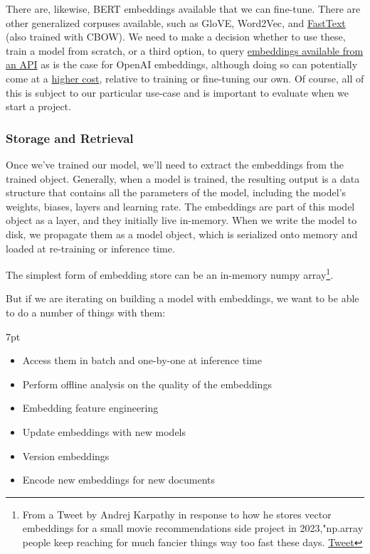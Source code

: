 \documentclass[11pt, table]{diazessay} %
\newenvironment{formal}{%
  \def\FrameCommand{%
	\hspace{1pt}%
	{\color{w_lightblue}\vrule width 2pt}%
	{\color{formalshade}\vrule width 4pt}%
	\colorbox{formalshade}%
  }%
  \MakeFramed{\advance\hsize-\width\FrameRestore}%
  \noindent\hspace{-4.55pt}%
  \begin{adjustwidth}{}{7pt}%
  \vspace{2pt}\vspace{2pt}%
}
{%
  \vspace{2pt}\end{adjustwidth}\endMakeFramed%
}
\begin{document}
\begin{sloppypar}
There are, likewise, BERT embeddings available that we can fine-tune. There are other generalized corpuses available, such as GloVE, Word2Vec, and \href{https://fasttext.cc/docs/en/crawl-vectors.html}{FastText} (also trained with CBOW). We need to make a decision whether to use these, train a model from scratch, or a third option, to query \href{https://platform.openai.com/docs/guides/embeddings/limitations-risks}{embeddings available from an API} as is the case for OpenAI embeddings, although doing so can potentially come at a \href{https://github.com/ray-project/llm-numbers#101----cost-ratio-of-openai-embedding-to-self-hosted-embedding}{higher cost}, relative to training or fine-tuning our own. Of course, all of this is subject to our particular use-case and is important to evaluate when we start a project.

\subsubsection{Storage and Retrieval}

Once we've trained our model, we'll need to extract the embeddings from the trained object. Generally, when a model is trained, the resulting output is a data structure that contains all the parameters of the model, including the model's weights, biases, layers and learning rate. The embeddings are part of this model object as a layer, and they initially live in-memory. When we write the model to disk, we propagate them as a model object, which is serialized onto memory and loaded at re-training or inference time.

The simplest form of embedding store can be an in-memory numpy array\footnote{From a Tweet by Andrej Karpathy in response to how he stores vector embeddings for a small movie recommendations side project in 2023,"np.array people keep reaching for much fancier things way too fast these days. \href{https://twitter.com/karpathy/status/1647374645316968449}{Tweet}}.

 But if we are iterating on building a model with embeddings, we want to be able to do a number of things with them:

\begin{formal}
\begin{itemize}
  \item Access them in batch and one-by-one at inference time
  \item Perform offline analysis on the quality of the embeddings
  \item Embedding feature engineering
  \item Update embeddings with new models
  \item Version embeddings
   \item Encode new embeddings for new documents
\end{itemize}
\end{formal}


\end{sloppypar}
\end{document}

